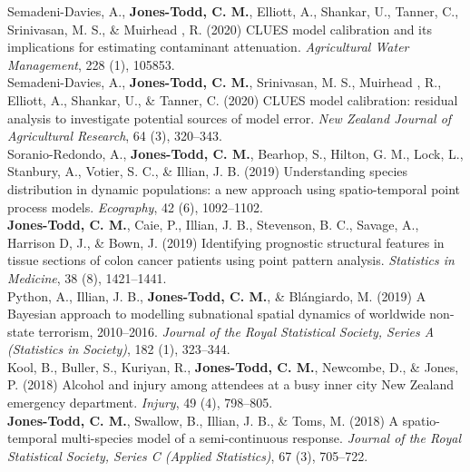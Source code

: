 \documentclass[10pt,a4paper]{moderncv}
\begin{document}
  Semadeni-Davies, A., \textbf{Jones-Todd, C. M.},  Elliott, A., Shankar, U., Tanner, C., Srinivasan, M. S., \& Muirhead , R. (2020) CLUES model calibration and its implications for estimating contaminant attenuation. \textit{Agricultural Water Management}, 228 (1), 105853.\\

    Semadeni-Davies, A., \textbf{Jones-Todd, C. M.}, Srinivasan, M. S.,  Muirhead , R.,  Elliott, A., Shankar, U., \& Tanner, C. (2020) CLUES model calibration: residual analysis to investigate potential sources of model error. \textit{New Zealand Journal of Agricultural Research}, 64 (3), 320--343.\\

 Soranio-Redondo, A., \textbf{Jones-Todd, C. M.}, Bearhop, S., Hilton, G. M., Lock, L., Stanbury, A., Votier, S. C., \& Illian, J. B. (2019) Understanding species distribution in dynamic populations: a new approach using spatio-temporal point process models. \textit{Ecography}, 42 (6), 1092--1102.\\
  
\vspace{-3pt}
 \textbf{Jones-Todd, C. M.}, Caie, P., Illian, J. B., Stevenson, B. C., Savage, A., Harrison D, J., \& Bown, J. (2019) Identifying prognostic structural features in tissue sections of colon cancer patients using point pattern analysis. \textit{Statistics in Medicine}, 38 (8), 1421--1441.\\

\vspace{-3pt}
 Python, A.,  Illian, J. B., \textbf{Jones-Todd, C. M.}, \& Bl\'{a}ngiardo, M. (2019) A Bayesian approach to modelling subnational spatial dynamics of worldwide non-state terrorism, 2010--2016. \textit{Journal of the Royal Statistical Society, Series  A (Statistics in Society)}, 182 (1), 323--344.\\

\vspace{-3pt}
Kool, B., Buller, S., Kuriyan, R., \textbf{Jones-Todd, C. M.}, Newcombe, D., \& Jones, P. (2018) Alcohol and injury among attendees at a busy inner city New Zealand emergency department. \textit{Injury}, 49 (4), 798--805.\\


 \textbf{Jones-Todd, C. M.}, Swallow, B., Illian, J. B., \& Toms, M. (2018) A spatio-temporal multi-species model of a semi-continuous response. \textit{Journal of the Royal Statistical Society, Series C (Applied Statistics)}, 67 (3), 705--722.\\
\end{document}

